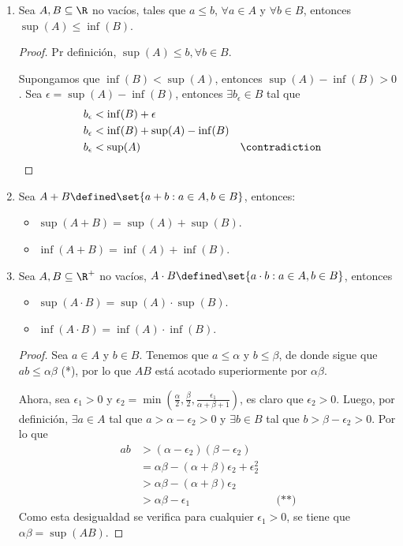 \begin{enumerate}[label=\alph*)]
  \item Sea $A, B\subseteq \R$ no vacíos, tales que $a\leq b$, $\forall a\in A$ y $\forall b\in B$, entonces $\sup(A)\leq \inf(B)$.
  
  \begin{proof}\leavevmode
    
  Pr definición, $\sup (A) \leq b, \forall b\in B$.
  
  Supongamos que $\inf(B) < \sup(A)$, entonces $\sup(A) - \inf(B) > 0$. Sea $\epsilon = \sup(A) - \inf(B)$, entonces $\exists b_\epsilon\in B$ tal que
    \begin{align*}
      b_\epsilon &< \inf(B) + \epsilon\\
      b_\epsilon &< \inf(B) + \sup(A) - \inf(B)\\
      b_\epsilon &< \sup(A) && \contradiction
    \end{align*}
  \end{proof}
  
  \item Sea $A+B \defined \set{a+b: a\in A, b\in B}$, entonces:
  \begin{itemize}
    \item $\sup(A + B) = \sup(A) + \sup(B)$.
    \item $\inf(A + B) = \inf(A) + \inf(B)$.
  \end{itemize}
  
  \item Sea $A, B\subseteq \R^+$ no vacíos, $A\cdot B \defined \set{a\cdot b: a\in A, b\in B}$, entonces
  \begin{itemize}
    \item $\sup(A\cdot B) = \sup(A) \cdot \sup(B)$.
    \item $\inf(A\cdot B) = \inf(A) \cdot \inf(B)$.
  \end{itemize}
  
  \begin{proof}\leavevmode
    Sea $a\in A$ y $b\in B$. Tenemos que $a\leq \alpha$ y $b\leq \beta$, de donde sigue que $ab \leq \alpha\beta$ (*), por lo que $AB$ está acotado superiormente por $\alpha\beta$.
    
    Ahora, sea $\epsilon_1>0$ y $\epsilon_2 = \min \left(\frac{\alpha}{2}, \frac{\beta}{2}, \frac{\epsilon_1}{\alpha+\beta+1}\right)$, es claro que $\epsilon_2>0$. Luego, por definición, $\exists a\in A$ tal que $a > \alpha - \epsilon_2 > 0$ y $\exists b\in B$ tal que $b>\beta - \epsilon_2 >0$. Por lo que
    \begin{align*}
      ab &> (\alpha - \epsilon_2) (\beta - \epsilon_2) \\
      &= \alpha\beta - (\alpha + \beta)\epsilon_2 + \epsilon^2_2\\
      &> \alpha\beta - (\alpha+\beta)\epsilon_2\\
      &> \alpha\beta - \epsilon_1 && \text{(**)}
    \end{align*}
    Como esta desigualdad se verifica para cualquier $\epsilon_1>0$, se tiene que $\alpha\beta = \sup(AB)$.
  \end{proof}
  

\end{enumerate}
